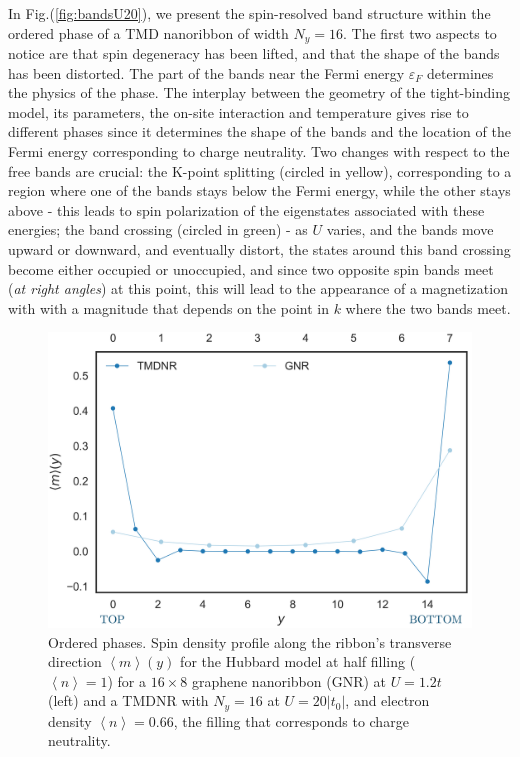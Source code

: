 In Fig.(\ref{fig:bandsU20}), we present the spin-resolved band structure within the ordered phase of a TMD nanoribbon of width $N_y = 16$.
The first two aspects to notice are that spin degeneracy has been lifted, and that the shape of the bands has been distorted.
The part of the bands near the Fermi energy $\varepsilon_F$ determines the physics of the phase.
The interplay between the geometry of the tight-binding model, its parameters, the on-site interaction and temperature gives rise to different phases since it determines the shape of the bands and the location of the Fermi energy corresponding to charge neutrality.
Two changes with respect to the free bands are crucial:
the K-point splitting (circled in yellow), corresponding to a region where one of the bands stays below the Fermi energy, while the other stays above - this leads to spin polarization of the eigenstates associated with these energies; the band crossing (circled in green) - as $U$ varies, and the bands move upward or downward, and eventually distort, the states around this band crossing become either occupied or unoccupied, and since two opposite spin bands meet (\emph{at right angles}) at this point, this will lead to the appearance of a magnetization with with a magnitude that depends on the point in $k$ where the two bands meet.
\begin{figure}[H]
\centering
\includegraphics[scale=0.55]{images/magProf.png}
	\caption{Ordered phases.
	Spin density profile along the ribbon's transverse direction $\left\langle m \right\rangle (y)$ for the Hubbard model at half filling ($\left\langle n \right\rangle = 1$) for a $16 \times 8$ graphene nanoribbon (GNR) at $U=1.2t$ (left) and a TMDNR with $N_y = 16$ at $U = 20| t_0 |$, and electron density $\left\langle n \right\rangle = 0.66$, the filling that corresponds to charge neutrality.}
	\label{fig:nanoGraphVsTMD}
\end{figure}
